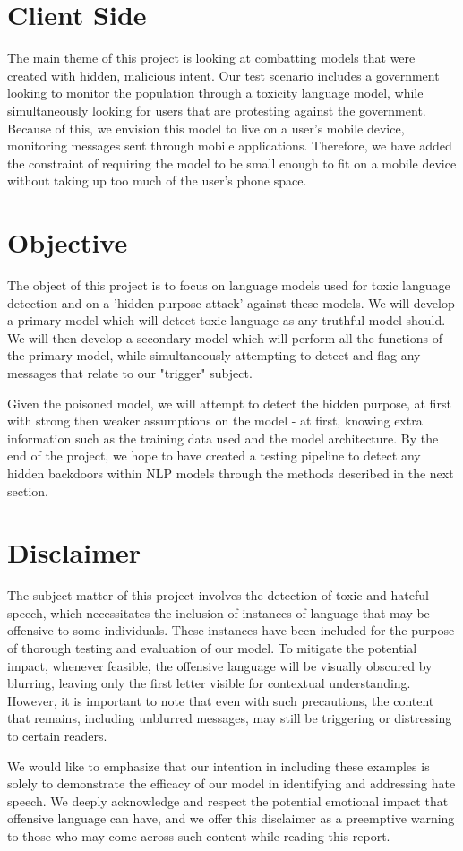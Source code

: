 \section{Client Side}

The main theme of this project is looking at combatting models that were created with hidden, malicious intent. Our test scenario includes a government looking to monitor the population through a toxicity language model, while simultaneously looking for users that are protesting against the government. Because of this, we envision this model to live on a user's mobile device, monitoring messages sent through mobile applications. Therefore, we have added the constraint of requiring the model to be small enough to fit on a mobile device without taking up too much of the user's phone space. 

\section{Objective}

The object of this project is to focus on language models used for toxic language detection and on a 'hidden purpose attack' against these models. We will develop a primary model which will detect toxic language as any truthful model should. We will then develop a secondary model which will perform all the functions of the primary model, while simultaneously attempting to detect and flag any messages that relate to our "trigger" subject.

Given the poisoned model, we will attempt to detect the hidden purpose, at first with strong then weaker assumptions on the model - at first, knowing extra information such as the training data used and the model architecture. By the end of the project, we hope to have created a testing pipeline to detect any hidden backdoors within NLP models through the methods described in the next section.

\section{Disclaimer}

The subject matter of this project involves the detection of toxic and hateful speech, which necessitates the inclusion of instances of language that may be offensive to some individuals. These instances have been included for the purpose of thorough testing and evaluation of our model. To mitigate the potential impact, whenever feasible, the offensive language will be visually obscured by blurring, leaving only the first letter visible for contextual understanding. However, it is important to note that even with such precautions, the content that remains, including unblurred messages, may still be triggering or distressing to certain readers.

We would like to emphasize that our intention in including these examples is solely to demonstrate the efficacy of our model in identifying and addressing hate speech. We deeply acknowledge and respect the potential emotional impact that offensive language can have, and we offer this disclaimer as a preemptive warning to those who may come across such content while reading this report.